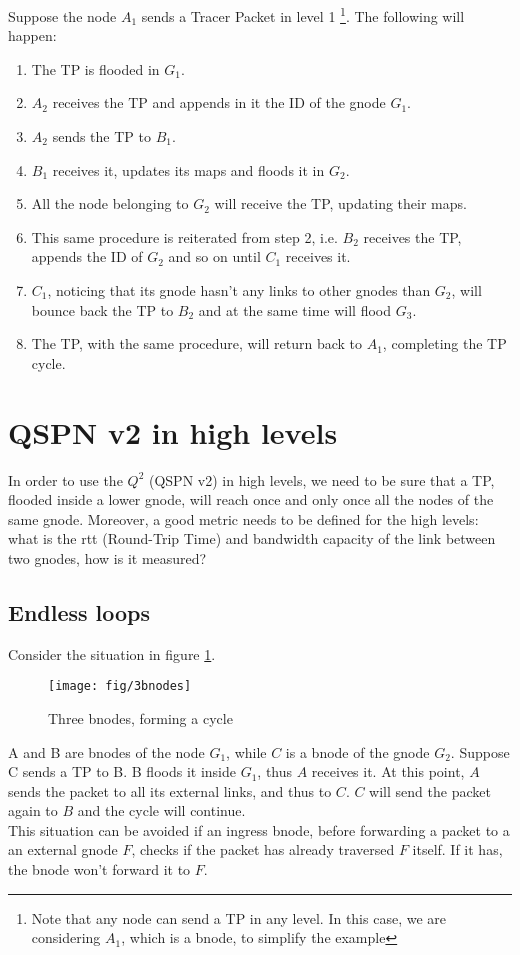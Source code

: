 \documentclass[a4paper]{article}
\begin{document}
Suppose the node $A_1$ sends a Tracer Packet in level 1 
\footnote{Note that any node can send a TP in any level. In this case, we are
considering $A_1$, which is a bnode, to simplify the example}. 
The following will happen:
\begin{enumerate}
	\item The TP is flooded in $G_1$.
	\item $A_2$ receives the TP and appends in it the ID of the gnode
		$G_1$.
	\item $A_2$ sends the TP to $B_1$.
	\item $B_1$ receives it, updates its maps and floods it in $G_2$.
	\item All the node belonging to $G_2$ will receive the TP, updating their
		maps.
	\item This same procedure is reiterated from step 2, i.e. $B_2$ receives
		the TP, appends the ID of $G_2$ and so on until $C_1$ receives
		it.
	\item $C_1$, noticing that its gnode hasn't any links to other gnodes
		than $G_2$, will bounce back the TP to $B_2$ and at the same
		time will flood $G_3$.
	\item The TP, with the same procedure, will return back to $A_1$,
		completing the TP cycle.
\end{enumerate}

\section{QSPN v2 in high levels}
In order to use the $Q^2$ (QSPN v2) in high levels, we need to be sure that a TP,
flooded inside a lower gnode, will reach once and only once all the nodes of
the same gnode. Moreover, a good metric needs to be defined for the high
levels: what is the rtt (Round-Trip Time) and bandwidth capacity of the link
between two gnodes, how is it measured?

\subsection{Endless loops}
Consider the situation in figure \ref{fig:3bnodes}.
\begin{figure}[h]
	\begin{center}
		\texttt{[image: fig/3bnodes]}
	\end{center}
	\caption{Three bnodes, forming a cycle}
	\label{fig:3bnodes}
\end{figure}
A and B are bnodes of the node $G_1$, while $C$ is a bnode of the gnode $G_2$.
Suppose C sends a TP to B. B floods it inside $G_1$, thus $A$ receives it. At
this point, $A$ sends the packet to all its external links, and thus to $C$.
$C$ will send the packet again to $B$ and the cycle will continue.\\
\newline
This situation can be avoided if an ingress bnode, before forwarding a packet to a an
external gnode $F$, checks if the packet has already traversed $F$ itself. If
it has, the bnode won't forward it to $F$.
\end{document}
